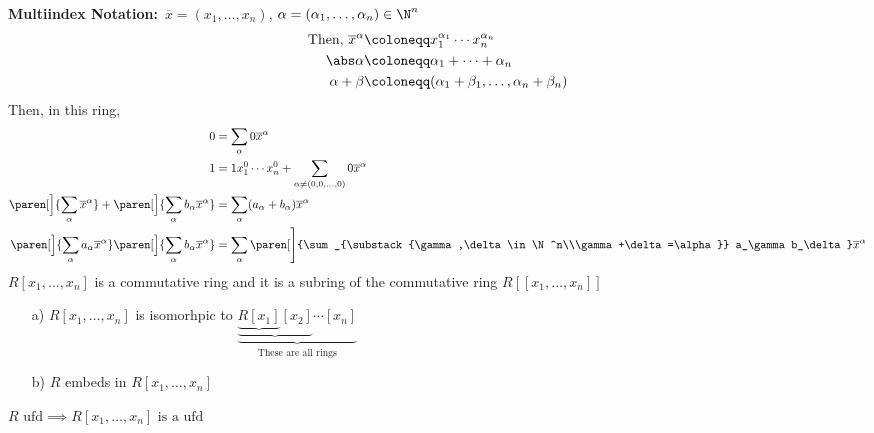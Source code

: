 \textbf{Multiindex Notation:}~$\overline x=(x_1,\dotsc,x_n)$, $\alpha=(\alpha_1,\dotsc,\alpha_n)\in\N^n$
\begin{align*}
\text{Then, }\overline{x}^\alpha &\coloneqq x_1^{\alpha_1}\dotsm x_n^{\alpha_n} \\
\abs\alpha &\coloneqq \alpha_1 + \dotsb + \alpha_n \\
\alpha+\beta &\coloneqq (\alpha_1+\beta_1,\dotsc,\alpha_n+\beta_n)
\end{align*}
Then, in this ring,
\begin{align*}
0 &= \sum_\alpha 0\overline{x}^\alpha \\
1 &= 1x_1^0 \dotsm x_n^0 + \sum_{\alpha\neq(0,0,\dotsc,0)} 0\overline{x}^\alpha \\
\paren[\Big]{\sum_\alpha\overline{x}^\alpha}+\paren[\Big]{\sum_\alpha b_\alpha\overline x^\alpha} &= \sum_\alpha(a_\alpha+b_\alpha)\overline x^\alpha \\
\paren[\Big]{\sum_\alpha a_\alpha\overline x^\alpha}\paren[\Big]{\sum_\alpha b_\alpha\overline x^\alpha} &= \sum_\alpha\paren[\Bigg]{\sum_{\substack{\gamma,\delta\in\N^n\\\gamma+\delta=\alpha}} a_\gamma b_\delta}\overline x^\alpha
\end{align*}
\check $R[x_1,\dotsc,x_n]$ is a commutative ring and it is a subring of the commutative ring $R[[x_1,\dotsc,x_n]]$
\ex
\begin{enumerate}
\item[a)] $R[x_1,\dotsc,x_n]$ is isomorhpic to $\underbrace{\underbrace{\underbrace{R[x_1]}[x_2]}\dotsm[x_n]}_{\text{These are all rings}}$
\item[b)] $R$ embeds in $R[x_1,\dotsc,x_n]$
\end{enumerate}
\cor $R\text{ ufd}\implies R[x_1,\dotsc,x_n]\text{ is a ufd}$


